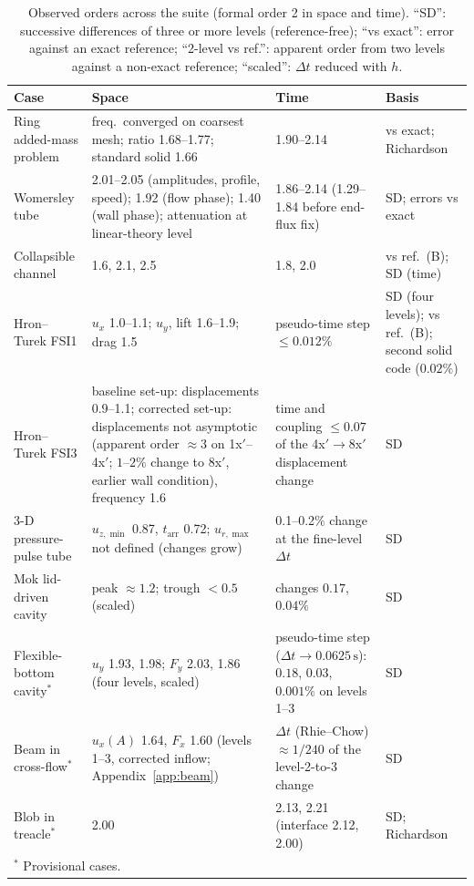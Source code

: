 \begin{table}[htbp]
	\centering
	\footnotesize
	\setlength{\tabcolsep}{3pt}
	\caption{Observed orders across the suite (formal order 2 in space and time). ``SD'': successive differences of three or more levels (reference-free); ``vs exact'': error against an exact reference; ``2-level vs ref.'': apparent order from two levels against a non-exact reference; ``scaled'': $\Delta t$ reduced with $h$.}
	\label{tab:orders}
	\begin{tabular}{p{3.0cm}p{4.6cm}p{3.4cm}p{2.8cm}}
		\toprule
		Case & Space & Time & Basis \\
		\midrule
		Ring added-mass problem & freq.\ converged on coarsest mesh; ratio 1.68--1.77; standard solid 1.66 & 1.90--2.14 & vs exact; Richardson \\
		Womersley tube & 2.01--2.05 (amplitudes, profile, speed); 1.92 (flow phase); 1.40 (wall phase); attenuation at linear-theory level & 1.86--2.14 (1.29--1.84 before end-flux fix) & SD; errors vs exact \\
		Collapsible channel & 1.6, 2.1, 2.5 & 1.8, 2.0 & vs ref.\ (B); SD (time) \\
		Hron--Turek FSI1 & $u_x$ 1.0--1.1; $u_y$, lift 1.6--1.9; drag 1.5 & pseudo-time step $\leq0.012\%$ & SD (four levels); vs ref.\ (B); second solid code ($0.02\%$) \\
		Hron--Turek FSI3 & baseline set-up: displacements 0.9--1.1; corrected set-up: displacements not asymptotic (apparent order $\approx3$ on 1x$'$--4x$'$; $1$--$2\%$ change to 8x$'$, earlier wall condition), frequency 1.6 & time and coupling $\leq0.07$ of the 4x$'\to$8x$'$ displacement change & SD \\
		3-D pressure-pulse tube & $u_{z,\min}$ 0.87, $t_\mathrm{arr}$ 0.72; $u_{r,\max}$ not defined (changes grow) & 0.1--0.2\% change at the fine-level $\Delta t$ & SD \\
		Mok lid-driven cavity & peak $\approx1.2$; trough $<0.5$ (scaled) & changes $0.17$, $0.04\%$ & SD \\
		Flexible-bottom cavity$^\ast$ & $u_y$ 1.93, 1.98; $F_y$ 2.03, 1.86 (four levels, scaled) & pseudo-time step ($\Delta t \to 0.0625\,\mathrm{s}$): $0.18$, $0.03$, $0.001\%$ on levels 1--3 & SD \\
		Beam in cross-flow$^\ast$ & $u_x(A)$ 1.64, $F_x$ 1.60 (levels 1--3, corrected inflow; Appendix~\ref{app:beam}) & $\Delta t$ (Rhie--Chow) $\approx1/240$ of the level-2-to-3 change & SD \\
		Blob in treacle$^\ast$ & 2.00 & 2.13, 2.21 (interface 2.12, 2.00) & SD; Richardson \\
		\bottomrule
		\multicolumn{4}{l}{$^\ast$ Provisional cases.}
	\end{tabular}
\end{table}


